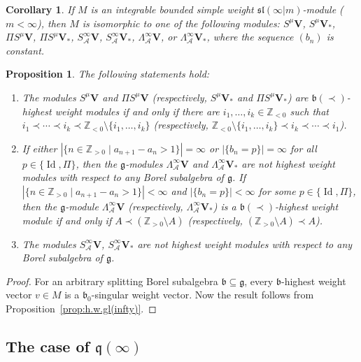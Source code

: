\documentclass[12pt]{amsart}
\newcommand\Z{\mathbb{Z}}
\newcommand\g{\mathfrak{g}}
\newcommand\fq{\mathfrak{q}}
\newcommand\fb{\mathfrak{b}}
\newcommand\fsl{\mathfrak{sl}}
\newcommand\cA{\mathcal{A}}
\newcommand\bV{\mathbf{V}}
\DeclareMathOperator{\Id}{Id}
\theoremstyle{plain}
\newtheorem{prop}[theo]{Proposition}
\newtheorem{cor}[theo]{Corollary}
\theoremstyle{definition}
\numberwithin{equation}{section}
\begin{document}
\begin{cor}\label{cor:classification.sl.case}
If $M$ is an integrable bounded simple weight $\fsl(\infty | m)$-module ($m<\infty$), then $M$ is isomorphic to one of the following modules: $S^\mu \bV$, $S^\mu \bV_*$, $\Pi S^\mu \bV$, $\Pi S^\mu \bV_*$, $S_\cA^\infty \bV$, $S_\cA^\infty \bV_*$, $\Lambda_\cA^{\infty} \bV$, or $\Lambda_\cA^{\infty} \bV_*$, where the sequence $(b_n)$ is constant.
\end{cor}

\begin{prop}\label{prop:M.h.w}
The following statements hold:
\begin{enumerate}
\item The modules $S^\mu \bV$ and $\Pi S^\mu \bV$ (respectively, $S^\mu \bV_*$ and $\Pi S^\mu \bV_*$) are $\fb(\prec)$-highest weight modules if and only if there are $i_1,\ldots, i_k\in \Z_{<0}$ such that $i_1\prec \cdots \prec i_k\prec \Z_{<0} \setminus \{i_1,\ldots, i_k\}$ (respectively, $\Z_{<0} \setminus \{i_1,\ldots, i_k\}\prec i_k\prec \cdots \prec i_1$).
\item If either $|\{n\in \Z_{>0}\mid a_{n+1} - a_n>1\}|=\infty$ or $|\{b_n=p\}|=\infty$ for all $p\in \{\Id, \Pi\}$, then the $\g$-modules $\Lambda^{\infty}_\cA \bV$ and $\Lambda^{\infty}_\cA \bV_*$ are not highest weight modules with respect to any Borel subalgebra of $\g$. If $|\{n\in \Z_{>0}\mid a_{n+1} - a_n>1\}|<\infty$ and $|\{b_n=p\}|<\infty$ for some $p\in \{\Id, \Pi\}$, then the $\g$-module $\Lambda^{\infty}_\cA \bV$ (respectively, $\Lambda^{\infty}_\cA \bV_*$) is a $\fb(\prec)$-highest weight module if and only if $A\prec (\Z_{>0}\setminus A)$ (respectively, $(\Z_{>0}\setminus A)\prec A$).
\item The modules $S^\infty_\cA \bV$, $S^\infty_\cA \bV_*$ are not highest weight modules with respect to any Borel subalgebra of $\g$.
\end{enumerate}
\end{prop}
\begin{proof}
For an arbitrary splitting Borel subalgebra $\fb\subseteq \g$, every $\fb$-highest weight vector $v\in M$ is a $\fb_0$-singular weight vector. Now the result follows from Proposition~\ref{prop:h.w.gl(infty)}.
\end{proof}

\subsection{The case of $\fq(\infty)$} 
\end{document}
